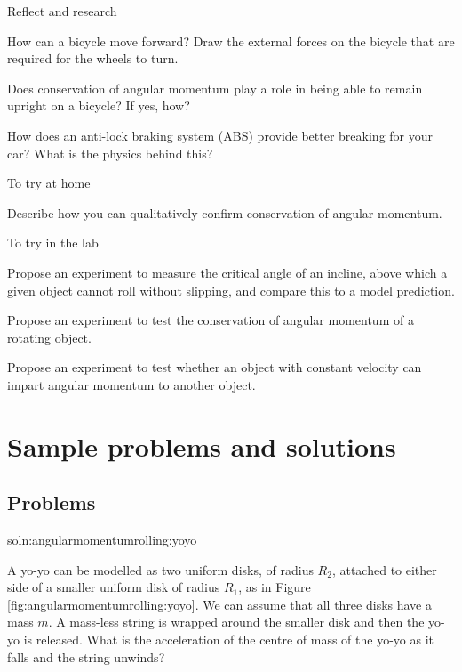 \begin{chapteractivity}{Reflect and research}
{
\item How can a bicycle move forward? Draw the external forces on the bicycle that are required for the wheels to turn.
\item Does conservation of angular momentum play a role in being able to remain upright on a bicycle? If yes, how?
\item How does an anti-lock braking system (ABS) provide better breaking for your car? What is the physics behind this?
}
\end{chapteractivity}

\begin{chapteractivity}{To try at home}
{
\item Describe how you can qualitatively confirm conservation of angular momentum. 
}
\end{chapteractivity}

\begin{chapteractivity}{To try in the lab}
{
\item Propose an experiment to measure the critical angle of an incline, above which a given object cannot roll without slipping, and compare this to a model prediction.
\item Propose an experiment to test the conservation of angular momentum of a rotating object. 
\item Propose an experiment to test whether an object with constant velocity can impart angular momentum to another object.
}
\end{chapteractivity}


\newpage
\section{Sample problems and solutions}
\subsection{Problems}
\begin{problem}{soln:angularmomentumrolling:yoyo}{\label{prob:angularmomentumrolling:yoyo} A yo-yo can be modelled as two uniform disks, of radius $R_2$, attached to either side of a smaller uniform disk of radius $R_1$, as in Figure \ref{fig:angularmomentumrolling:yoyo}. We can assume that all three disks have a mass $m$. A mass-less string is wrapped around the smaller disk and then the yo-yo is released. What is the acceleration of the centre of mass of the yo-yo as it falls and the string unwinds?

}
\end{problem}

